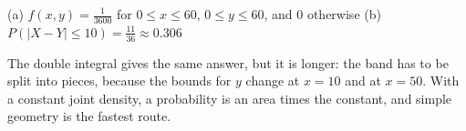 \begin{solution}
	\begin{answer}
		(a) $f(x,y)=\frac{1}{3600}$ for $0\le x\le60$, $0\le y\le60$, and $0$
		otherwise \quad
		(b) $P(|X-Y|\le10)=\frac{11}{36}\approx0.306$
	\end{answer}
	\begin{remark}
		The double integral gives the same answer, but it is longer: the band
		has to be split into pieces, because the bounds for $y$ change at
		$x=10$ and at $x=50$. With a constant joint density, a probability is
		an area times the constant, and simple geometry is the fastest route.
	\end{remark}
\end{solution}

